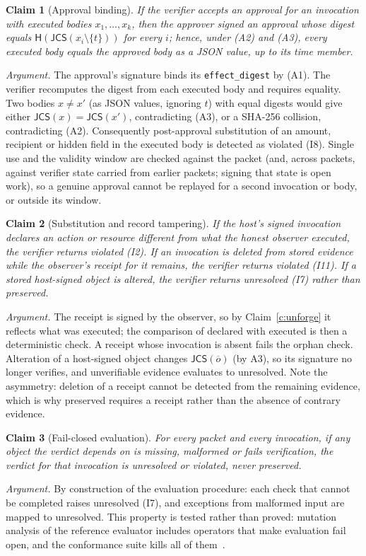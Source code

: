\documentclass[11pt,a4paper]{article}
\newtheorem{claim}{Claim}
\theoremstyle{definition}
\theoremstyle{remark}
\newcommand{\pres}{\textsf{preserved}}
\newcommand{\viol}{\textsf{violated}}
\newcommand{\unres}{\textsf{unresolved}}
\newcommand{\code}[1]{\texttt{#1}}
\newcommand{\Canon}{\mathsf{JCS}}
\newcommand{\Hash}{\mathsf{H}}
\begin{document}
\begin{claim}[Approval binding]\label{c:bind}
If the verifier accepts an approval for an invocation with executed bodies $x_1,\dots,x_k$, then the approver signed an approval whose digest equals $\Hash(\Canon(x_i\setminus\{t\}))$ for every $i$; hence, under (A2) and (A3), every executed body equals the approved body as a JSON value, up to its time member.
\end{claim}
\emph{Argument.} The approval's signature binds its \code{effect\_digest} by (A1). The verifier recomputes the digest from each executed body and requires equality. Two bodies $x \ne x'$ (as JSON values, ignoring $t$) with equal digests would give either $\Canon(x)=\Canon(x')$, contradicting (A3), or a SHA-256 collision, contradicting (A2). Consequently post-approval substitution of an amount, recipient or hidden field in the executed body is detected as \viol{} (I8). Single use and the validity window are checked against the packet (and, across packets, against verifier state carried from earlier packets; signing that state is open work), so a genuine approval cannot be replayed for a second invocation or body, or outside its window.

\begin{claim}[Substitution and record tampering]\label{c:tamper}
If the host's signed invocation declares an action or resource different from what the honest observer executed, the verifier returns \viol{} (I2). If an invocation is deleted from stored evidence while the observer's receipt for it remains, the verifier returns \viol{} (I11). If a stored host-signed object is altered, the verifier returns \unres{} (I7) rather than \pres{}.
\end{claim}
\emph{Argument.} The receipt is signed by the observer, so by Claim~\ref{c:unforge} it reflects what was executed; the comparison of declared with executed is then a deterministic check. A receipt whose invocation is absent fails the orphan check. Alteration of a host-signed object changes $\Canon(\overline{o})$ (by A3), so its signature no longer verifies, and unverifiable evidence evaluates to \unres{}. Note the asymmetry: deletion of a receipt cannot be detected from the remaining evidence, which is why \pres{} requires a receipt rather than the absence of contrary evidence.

\begin{claim}[Fail-closed evaluation]\label{c:failclosed}
For every packet and every invocation, if any object the verdict depends on is missing, malformed or fails verification, the verdict for that invocation is \unres{} or \viol{}, never \pres{}.
\end{claim}
\emph{Argument.} By construction of the evaluation procedure: each check that cannot be completed raises \unres{} (I7), and exceptions from malformed input are mapped to \unres{}. This property is tested rather than proved: mutation analysis of the reference evaluator includes operators that make evaluation fail open, and the conformance suite kills all of them~\cite{amep}.
\end{document}
